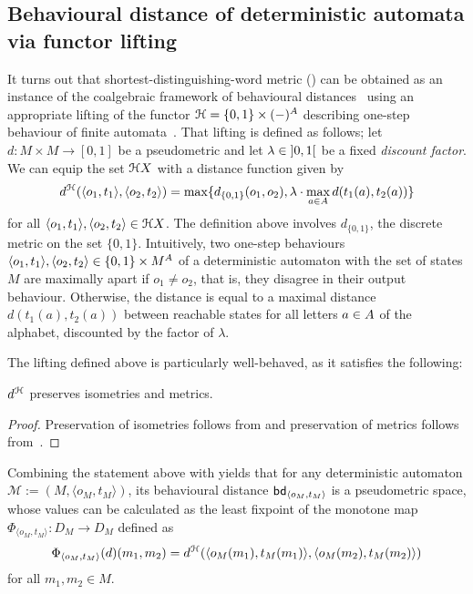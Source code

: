 \subsection{Behavioural distance of deterministic automata via functor lifting}	
It turns out that shortest-distinguishing-word metric () can be obtained as an instance of the coalgebraic framework of behavioural distances~\cite[Example~6.5]{Baldan:2018:Coalgebraic} using an appropriate lifting of the functor $\mathcal{H} = \{0,1\} \times (-)^{A}$ describing one-step behaviour of finite automata~\cite[Example~6.3]{Baldan:2018:Coalgebraic}. That lifting is defined as follows; let $d \colon M \times M \to [0,1]$ be a pseudometric and let $\lambda \in \interval[open]{0}{1}$ be a fixed \emph{discount factor}. We can equip the set $\mathcal{H} X$ with a distance function given by
\[
	d^{\mathcal{H}}(\langle o_1, t_1 \rangle, \langle o_2, t_2 \rangle) = \max\{d_{\{0,1\}}(o_1, o_2), \lambda \cdot \max_{a \in {A}} d(t_1(a), t_2(a))\} 
\]   
for all $\langle o_1, t_1 \rangle, \langle o_2, t_2 \rangle \in \mathcal{H} X$. The definition above involves $d_{\{0,1\}}$, the discrete metric on the set $\{0,1\}$. Intuitively, two one-step behaviours $\langle o_1, t_1\rangle, \langle o_2, t_2 \rangle \in \{0,1\} \times M^{A}$ of a deterministic automaton with the set of states $M$ are maximally apart if $o_1 \neq o_2$, that is, they disagree in their output behaviour. Otherwise, the distance is equal to a maximal distance $d(t_1(a), t_2(a))$ between reachable states for all letters $a \in {A}$ of the alphabet, discounted by the factor of $\lambda$.

The lifting defined above is particularly well-behaved, as it satisfies the following:

\begin{proposition}
	$d^{\mathcal{H}}$ preserves isometries and metrics.
\end{proposition}
\begin{proof}
	Preservation of isometries follows from \cite[Theorem 5.23]{Baldan:2018:Coalgebraic} and preservation of metrics follows from~\cite[Theorem~5.24]{Baldan:2018:Coalgebraic}.
\end{proof}
Combining the statement above with  yields that for any deterministic automaton $\mathcal{M} := (M, \langle o_M, t_M \rangle)$, its behavioural distance $\mathsf{bd}_{\langle o_M, t_M \rangle}$ is a pseudometric space, whose values can be calculated as the least fixpoint of the monotone map $\Phi_{\langle o_M, t_M\rangle} \colon D_M \to D_M$ defined as
$$
\Phi_{\langle o_M, t_M\rangle}(d)(m_1, m_2) = d^{\mathcal{H}}(\langle o_M(m_1), t_{M}(m_1) \rangle, \langle o_M(m_2), t_{M}(m_2) \rangle)
$$
for all $m_1, m_2 \in M$.


